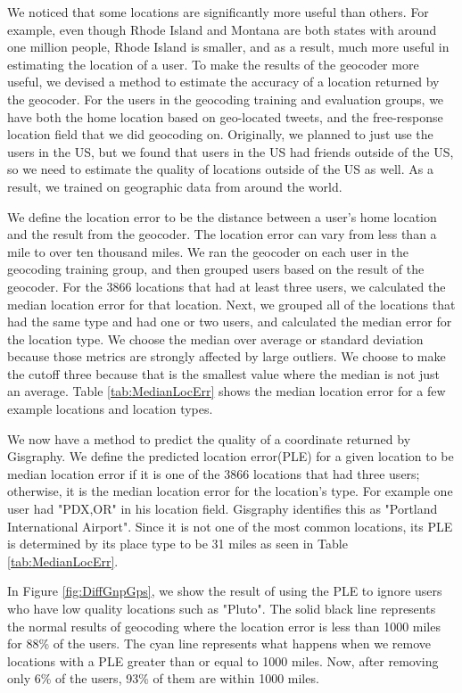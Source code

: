 \documentclass{sig-alternate}
\begin{document}
We noticed that some locations are significantly more useful than others.
For example, even though Rhode Island and Montana are both states with around
one million people, Rhode Island is smaller, and as a result, much more useful
in estimating the location of a user.
To make the results of the geocoder more useful, we devised a method to estimate the accuracy of a location returned by the geocoder.
For the users in the geocoding training and evaluation groups, we have both the
home location based on geo-located tweets, and the free-response location field
that we did geocoding on.
Originally, we planned to just use the users in the US, but we found that users
in the US had friends outside of the US, so we need to estimate the quality of
locations outside of the US as well.
As a result, we trained on geographic data from around the world.

We define the location error to be the distance between a user's home location and the result from the geocoder.
The location error can vary from less than a mile to over ten thousand miles.
We ran the geocoder on each user in the geocoding training group, and then grouped users based on the result of the geocoder.
For the 3866 locations that had at least three users, we calculated the median location error for that location.
Next, we grouped all of the locations that had the same type and had one or two users, and calculated the median error for the location type.
We choose the median over average or standard deviation because those metrics are strongly affected by large outliers.
We choose to make the cutoff three because that is the smallest value where the median is not just an average.
Table \ref{tab:MedianLocErr} shows the median location error for a few example locations and location types.

We now have a method to predict the quality of a coordinate returned by Gisgraphy.
We define the predicted location error(PLE) for a given location to be median location error if it is one of the 3866 locations that had three users; otherwise, it is the median location error for the location's type.
For example one user had "PDX,OR" in his location field. Gisgraphy identifies this as "Portland International Airport". Since it is not one of the most common locations, its PLE is determined by its place type to be 31 miles as seen in Table \ref{tab:MedianLocErr}.

In Figure \ref{fig:DiffGnpGps}, we show the result of using the PLE to ignore users who have low quality locations such as "Pluto".
The solid black line represents the normal results of geocoding where the location error is less than 1000 miles for 88\% of the users.
The cyan line represents what happens when we remove locations with a PLE greater than or equal to 1000 miles. Now, after removing only 6\% of the users, 93\% of them are within 1000 miles.
\end{document}
